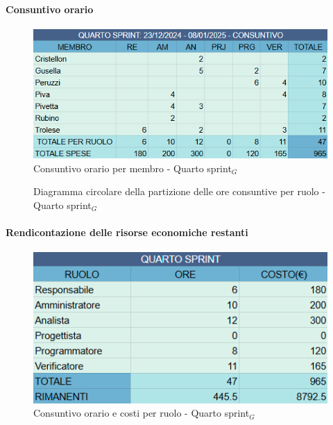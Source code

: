 \documentclass[10pt]{article}
\begin{document}
{{{{{    \paragraph{Consuntivo orario}\mbox{}\vspace{0.4em}
    \begin{figure}[ht]
    	\centering
    	\includegraphics[width=0.6\linewidth]{consuntivoOreQuartoSprint.PNG}
    	\caption{Consuntivo orario per membro - Quarto sprint$_G$}
    	\label{fig:Consuntivo orario per membro - quarto sprint$_G$}
    \end{figure}

    \begin{figure}[H]
        \centering
        \caption{Diagramma circolare della partizione delle ore consuntive per ruolo - Quarto sprint$_G$ }
        \label{fig:Diagramma circolare della partizione delle ore consuntive per ruolo - quarto sprint$_G$}
    \end{figure}

    \paragraph{Rendicontazione delle risorse economiche restanti}\mbox{}\vspace{0.4em}
    \begin{figure}[H]
    	\centering
    	\includegraphics[width=0.6\linewidth]{oreCostiQuartoSprint.PNG}
    	\caption{Consuntivo orario e costi per ruolo - Quarto sprint$_G$}
    	\label{fig:Consuntivo orario e costi per ruolo - Quarto sprint$_G$}
    \end{figure}
    
}}}}}
\end{document}

